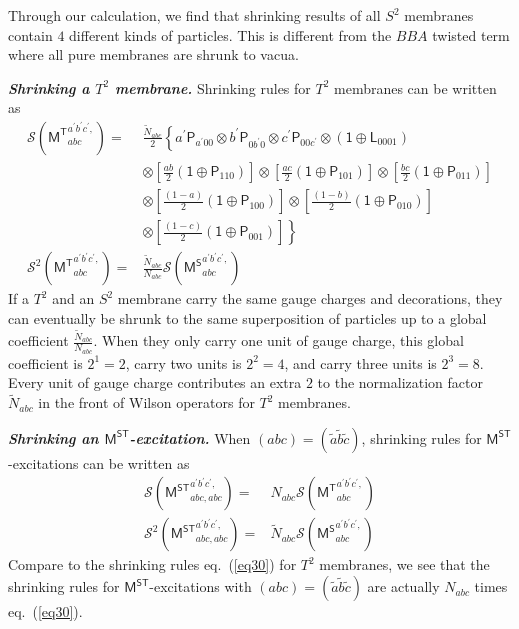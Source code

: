 \documentclass[11pt,nofootinbib,preprint]{revtex4-1}
\begin{document}
Through our calculation, we find that shrinking results of all $S^2$ membranes contain $4$ different kinds of particles. This is different from the $BBA$ twisted term where all pure membranes are shrunk to vacua.

\textbf{\textit{Shrinking a $T^2$ membrane.}}
Shrinking rules for $T^2$ membranes can be written as 
\begin{align}
	\mathcal{S} \left( \mathsf{M^T}_{abc}^{a^{\prime}b^{\prime}c^{\prime},} \right) =&\frac{\tilde{N}_{abc}}{2}\left\{ a^{\prime}\mathsf{P}_{a^{\prime}00}\otimes b^{\prime}\mathsf{P}_{0b^{\prime}0}\otimes c^{\prime}\mathsf{P}_{00c^{\prime}}\otimes \left( \mathsf{1}\oplus \mathsf{L}_{0001} \right) \right. \nonumber
	\\
	&\otimes \left[ \frac{ab}{2}\left( \mathsf{1}\oplus \mathsf{P}_{110} \right) \right] \otimes \left[ \frac{ac}{2}\left( \mathsf{1}\oplus \mathsf{P}_{101} \right) \right] \otimes \left[ \frac{bc}{2}\left( \mathsf{1}\oplus \mathsf{P}_{011} \right) \right] \nonumber
	\\
	&\otimes \left[ \frac{\left( 1-a \right)}{2}\left( \mathsf{1}\oplus \mathsf{P}_{100} \right) \right] \otimes \left[ \frac{\left( 1-b \right)}{2}\left( \mathsf{1}\oplus \mathsf{P}_{010} \right) \right] \nonumber
	\\
	&\left.\otimes \left[ \frac{\left( 1-c \right)}{2}\left( \mathsf{1}\oplus \mathsf{P}_{001} \right) \right] \right\} \nonumber
	\\
	\mathcal{S}^{2} \left( \mathsf{M^T}_{abc}^{a^{\prime}b^{\prime}c^{\prime},} \right) =&\frac{\tilde{N}_{abc}}{N_{abc}}\mathcal{S} \left( \mathsf{M^S}_{abc}^{a^{\prime}b^{\prime}c^{\prime},} \right)
	\label{eq30}
\end{align}
If a $T^2$ and an $S^2$ membrane carry the same gauge charges and decorations, they can eventually be shrunk to the same superposition of particles up to a global coefficient $\frac{\tilde{N}_{abc}}{N_{abc}}$. When they only carry one unit of gauge charge, this global coefficient is $2^1=2$, carry two units is $2^2=4$, and carry three units is $2^3=8$. Every unit of gauge charge contributes an extra $2$ to the normalization factor $\tilde{N}_{abc}$ in the front of Wilson operators for $T^2$ membranes.

\textbf{\textit{Shrinking an $\mathsf{M^{ST}}$-excitation.}}
When $\left(abc\right)=\left(\tilde{a}\tilde{b}\tilde{c}\right)$, shrinking rules for $\mathsf{M^{ST}}$-excitations can be written as 
\begin{align}
	\mathcal{S} \left( \mathsf{M^{ST}}_{abc,abc}^{a^{\prime}b^{\prime}c^{\prime},} \right) =&N_{abc}\mathcal{S} \left( \mathsf{M^T}_{abc}^{a^{\prime}b^{\prime}c^{\prime},} \right) \nonumber
	\\
	\mathcal{S} ^2\left( \mathsf{M^{ST}}_{abc,abc}^{a^{\prime}b^{\prime}c^{\prime},} \right) =&\tilde{N}_{abc}\mathcal{S} \left( \mathsf{M^S}_{abc}^{a^{\prime}b^{\prime}c^{\prime},} \right) 
\end{align}
Compare to the shrinking rules eq.~(\ref{eq30}) for $T^2$ membranes, we see that the shrinking rules for $\mathsf{M^{ST}}$-excitations with $\left(abc\right)=\left(\tilde{a}\tilde{b}\tilde{c}\right)$ are actually $N_{abc}$ times eq.~(\ref{eq30}). 
\end{document}
